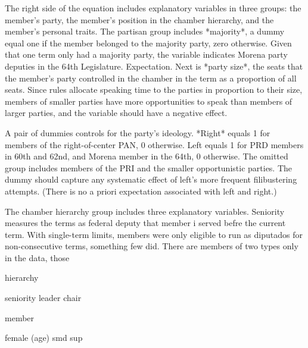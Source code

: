 \documentclass[letter,12pt]{article}
\begin{document}
The right side of the equation includes explanatory variables in three groups: the member's party, the member's position in the chamber hierarchy, and the member's personal traits. The partisan group includes *majority*, a dummy equal one if the member belonged to the majority party, zero otherwise. Given that one term only had a majority party, the variable indicates Morena party deputies in the 64th Legislature. Expectation. Next is *party size*, the seats that the member's party controlled in the chamber in the term as a proportion of all seats. Since rules allocate speaking time to the parties in proportion to their size, members of smaller parties have more opportunities to speak than  members of larger parties, and the variable should have a negative effect.

A pair of dummies controls for the party's ideology. *Right* equals 1 for members of the right-of-center PAN, 0 otherwise. Left equals 1 for PRD members in 60th and 62nd, and Morena member in the 64th, 0 otherwise. The omitted group includes members of the PRI and the smaller opportunistic parties. The dummy should capture any systematic effect of left's more frequent filibustering attempts. (There is no a priori expectation associated with left and right.)

The chamber hierarchy group includes three explanatory variables. Seniority measures the terms as federal deputy that member i served befre the current term. With single-term limits, members were only eligible to run as diputados for non-consecutive terms, something few did. There are members of two types only in the data, those  

hierarchy

seniority
leader
chair


member

female
(age)
smd
sup
\end{document}
